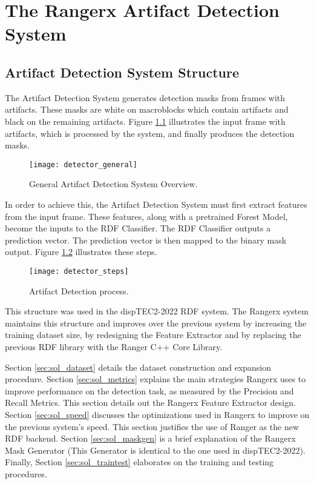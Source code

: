 \chapter{The Rangerx Artifact Detection System}
\label{ch:solucion}

\section{Artifact Detection System Structure}
\label{sec:sol_struct}

The Artifact Detection System generates detection masks from frames with artifacts. These masks are white on macroblocks which contain artifacts and black on the remaining artifacts. Figure \ref{fig:detector_overview} illustrates the input frame with artifacts, which is processed by the system, and finally produces the detection masks.

\begin{figure} [!h]
  \centering
  
  \texttt{[image: detector\_general]}
  
  \caption{General Artifact Detection System Overview. }
  \label{fig:detector_overview}

\end{figure}

In order to achieve this, the Artifact Detection System must first extract features from the input frame. These features, along with a pretrained Forest Model, become the inputs to the RDF Classifier. The RDF Classifier outputs a prediction vector. The prediction vector is then mapped to the binary mask output. Figure \ref{fig:detector_steps} illustrates these steps.

\begin{figure} [!h]
  \centering
  
  \texttt{[image: detector\_steps]}
  
  \caption{Artifact Detection process. }
  \label{fig:detector_steps}

\end{figure}

This structure was used in the dispTEC2-2022 RDF system. The Rangerx system maintains this structure and improves over the previous system by increasing the training dataset size, by redesigning the Feature Extractor and by replacing the previous RDF library with the Ranger C++ Core Library.

Section \ref{sec:sol_dataset} details the dataset construction and expansion procedure. Section \ref{sec:sol_metrics} explains the main strategies Rangerx uses to improve performance on the detection task, as measured by the Precision and Recall Metrics. This section details out the Rangerx Feature Extractor design. Section \ref{sec:sol_speed} discusses the optimizations used in Rangerx to improve on the previous system's speed. This section justifies the use of Ranger as the new RDF backend. Section \ref{sec:sol_maskgen} is a brief explanation of the Rangerx Mask Generator (This Generator is identical to the one used in dispTEC2-2022). Finally, Section \ref{sec:sol_traintest} elaborates on the training and testing procedures.

